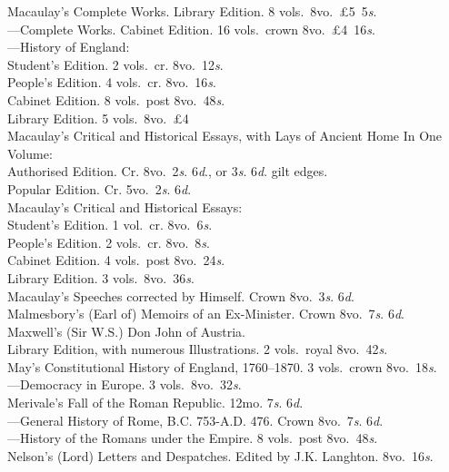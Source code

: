 \documentclass[letterpaper,12pt,oneside,openany]{memoir}
\newcommand{\D}{\hspace*{5mm}}
\newcommand{\E}{\hspace*{2mm}---\hspace*{2mm}}
\begin{document}
\begin{footnotesize}
Macaulay's Complete Works. Library Edition. 8 vols.\ 8vo.\ \pounds5\ 5\textit{s}.\\
\E Complete Works. Cabinet Edition. 16 vols.\ crown 8vo.\ \pounds4\ 16\textit{s}.\\
\E History of England:\\
\D \D Student's Edition. 2 vols.\ cr. 8vo.\ 12\textit{s}.\\
\D \D People's Edition. 4 vols.\ cr. 8vo.\ 16\textit{s}.\\
\D \D Cabinet Edition. 8 vols.\ post 8vo.\ 48\textit{s}.\\
\D \D Library Edition. 5 vols.\ 8vo.\ \pounds4\\
Macaulay's Critical and Historical Essays, with Lays of Ancient Home In One Volume:\\
\D Authorised Edition. Cr. 8vo.\ 2\textit{s}. 6\textit{d}., or 3\textit{s}. 6\textit{d}. gilt edges.\\
\D Popular Edition. Cr. 5vo.\ 2\textit{s}. 6\textit{d}.\\
Macaulay's Critical and Historical Essays:\\
\D Student's Edition. 1 vol.\ cr. 8vo.\ 6\textit{s}.\\
\D People's Edition. 2 vols.\ cr. 8vo.\ 8\textit{s}.\\
\D Cabinet Edition. 4 vols.\ post 8vo.\ 24\textit{s}.\\
\D Library Edition. 3 vols.\ 8vo.\ 36\textit{s}.\\
Macaulay's Speeches corrected by Himself. Crown 8vo.\ 3\textit{s}. 6\textit{d}.\\
Malmesbory's (Earl of) Memoirs of an Ex-Minister. Crown 8vo.\ 7\textit{s}. 6\textit{d}.\\
Maxwell's (Sir W.S.) Don John of Austria. \\
\D Library Edition, with numerous Illustrations. 2 vols.\ royal 8vo.\ 42\textit{s}.\\
May's Constitutional History of England, 1760--1870. 3 vols.\ crown 8vo.\ 18\textit{s}.\\
\E Democracy in Europe. 3 vols.\ 8vo.\ 32\textit{s}.\\
Merivale's Fall of the Roman Republic. 12mo. 7\textit{s}. 6\textit{d}.\\
\E General History of Rome, B.C. 753-A.D. 476. Crown 8vo.\ 7\textit{s}. 6\textit{d}.\\
\E History of the Romans under the Empire. 8 vols.\ post 8vo.\ 48\textit{s}.\\
Nelson's (Lord) Letters and Despatches. Edited by J.K. Langhton. 8vo.\ 16\textit{s}.\\

\end{footnotesize}
\end{document}
